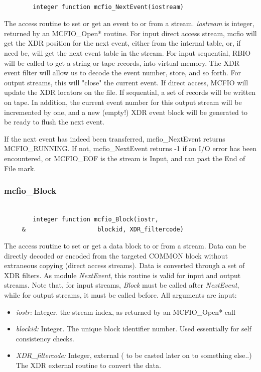 \begin{verbatim}

        integer function mcfio_NextEvent(iostream)

\end{verbatim}
The access routine to set or get an event to or from a  stream. {\em iostream}
is integer, returned by an MCFIO\_Open* routine.  For input direct access stream,
mcfio will get the XDR position  for the next event, either from the internal
table, or, if  need be, will get the next event table in the stream.  For input
sequential, RBIO will be called to get a string  or tape records, into virtual
memory. The XDR event filter will allow us to decode the event number, store,
and so forth. For output streams, this will "close" the current event.  If
direct access, MCFIO will update the XDR locators on the file. If sequential, a
set of records will be written on tape.  In addition, the current event number
for this output stream will  be incremented by one, and a new (empty!) XDR
event block will be  generated to be ready to flush the next event.

	If the next event has indeed been transferred, mcfio\_NextEvent returns
MCFIO\_RUNNING.  If not, mcfio\_NextEvent returns -1 if an I/O error has
been encountered, or MCFIO\_EOF is the stream is Input, and ran past the
End of File mark.

\subsubsection{mcfio\_Block}

\begin{verbatim}

        integer function mcfio_Block(iostr,
     &                    blockid, XDR_filtercode)

\end{verbatim}
The access routine to set or get a data  block to or from a  stream. Data can
be directly decoded or encoded from the targeted  COMMON block without
extraneous copying (direct access streams). Data is converted through a set of
XDR filters.  As module {\em NextEvent}, this routine is valid  for input and
output streams. Note that, for input streams, {\em Block} must be called after
{\em NextEvent}, while for output streams, it must be called before. All
arguments are input:

\begin{itemize}
\item {\em iostr:} Integer. the stream index, as returned by an MCFIO\_Open*
call
\item{\em blockid:} Integer. The unique block identifier number. Used
essentially for self consistency checks.
\item{\em XDR\_filtercode:} Integer, external
 ( to be casted later on to something else..)
  The XDR external routine to convert the data.
\end{itemize}

